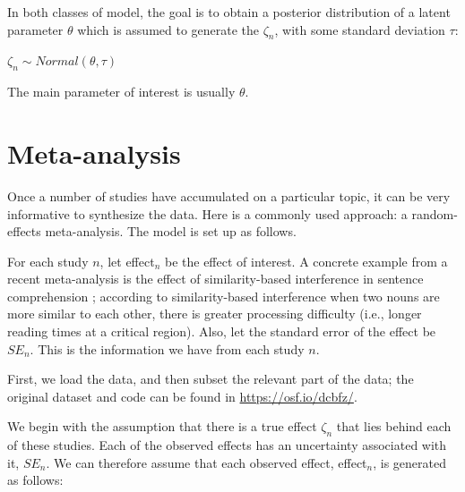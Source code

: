 \documentclass[12pt,]{krantz}
\newenvironment{Shaded}{\begin{snugshade}}{\end{snugshade}}
\newcommand{\KeywordTok}[1]{\textcolor[rgb]{0.13,0.29,0.53}{\textbf{#1}}}
\newcommand{\DataTypeTok}[1]{\textcolor[rgb]{0.13,0.29,0.53}{#1}}
\newcommand{\DecValTok}[1]{\textcolor[rgb]{0.00,0.00,0.81}{#1}}
\newcommand{\StringTok}[1]{\textcolor[rgb]{0.31,0.60,0.02}{#1}}
\newcommand{\OperatorTok}[1]{\textcolor[rgb]{0.81,0.36,0.00}{\textbf{#1}}}
\newcommand{\NormalTok}[1]{#1}
\theoremstyle{definition}
\theoremstyle{definition}
\theoremstyle{definition}
\theoremstyle{remark}
\begin{document}
In both classes of model, the goal is to obtain a posterior distribution
of a latent parameter \(\theta\) which is assumed to generate the
\(\zeta_n\), with some standard deviation \(\tau\):

\(\zeta_n \sim Normal(\theta,\tau)\)

The main parameter of interest is usually \(\theta\).

\section{Meta-analysis}\label{meta-analysis}

Once a number of studies have accumulated on a particular topic, it can
be very informative to synthesize the data. Here is a commonly used
approach: a random-effects meta-analysis. The model is set up as
follows.

For each study \(n\), let effect\(_n\) be the effect of interest. A
concrete example from a recent meta-analysis is the effect of
similarity-based interference in sentence comprehension
\citep{JaegerEtAl2017}; according to similarity-based interference when
two nouns are more similar to each other, there is greater processing
difficulty (i.e., longer reading times at a critical region). Also, let
the standard error of the effect be \(SE_n\). This is the information we
have from each study \(n\).

First, we load the data, and then subset the relevant part of the data;
the original dataset and code can be found in
\url{https://osf.io/dcbfz/}.

\begin{Shaded}
\end{Shaded}

We begin with the assumption that there is a true effect \(\zeta_n\)
that lies behind each of these studies. Each of the observed effects has
an uncertainty associated with it, \(SE_n\). We can therefore assume
that each observed effect, effect\(_n\), is generated as follows:
\end{document}
